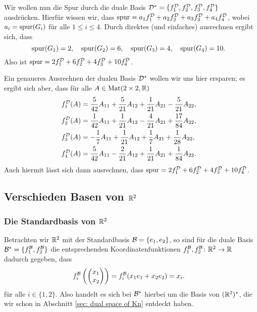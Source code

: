 \documentclass[a4paper,10pt]{article}
\begin{document}
Wir wollen nun die Spur durch die duale Basis $\mathcal{D}^* = \{f^{\mathcal{D}}_1, f^{\mathcal{D}}_2, f^{\mathcal{D}}_3, f^{\mathcal{D}}_4\}$ ausdrücken. Hierfür wissen wir, dass $\mathrm{spur} = a_1 f^{\mathcal{D}}_1 + a_2 f^{\mathcal{D}}_2 + a_3 f^{\mathcal{D}}_3 + a_4 f^{\mathcal{D}}_4$, wobei $a_i = \mathrm{spur}(G_i)$ für alle $1 \leq i \leq 4$. Durch direktes (und einfaches) ausrechnen ergibt sich, dass
\[
 \mathrm{spur}(G_1) = 2, \quad
 \mathrm{spur}(G_2) = 6, \quad
 \mathrm{spur}(G_3) = 4, \quad
 \mathrm{spur}(G_4) = 10.
\]
Also ist $\mathrm{spur} = 2 f^{\mathcal{D}}_1 + 6 f^{\mathcal{D}}_2 + 4 f^{\mathcal{D}}_3 + 10 f^{\mathcal{D}}_4$.

Ein genaueres Ausrechnen der dualen Basis $\mathcal{D}^*$ wollen wir uns hier ersparen; es ergibt sich aber, dass für alle $A \in \mathrm{Mat}(2 \times 2, \mathbb{R})$
\begin{align*}
 f^{\mathcal{D}}_1(A) &= \frac{5}{42} A_{11} + \frac{5}{21} A_{12} + \frac{1}{21} A_{21} -\frac{5}{21} A_{22}, \\
 f^{\mathcal{D}}_2(A) &= \frac{1}{42} A_{11} + \frac{1}{21} A_{12} - \frac{4}{21} A_{21} + \frac{17}{84} A_{22}, \\
 f^{\mathcal{D}}_3(A) &= -\frac{1}{7} A_{11} + \frac{1}{21} A_{12} + \frac{1}{7} A_{21} + \frac{1}{28} A_{22}, \\
 f^{\mathcal{D}}_4(A) &= \frac{5}{42} A_{11} - \frac{2}{21} A_{12} + \frac{1}{21} A_{21} + \frac{1}{84} A_{22}.
\end{align*}
Auch hiermit lässt sich dann ausrechnen, dass $\mathrm{spur} = 2 f^{\mathcal{D}}_1 + 6 f^{\mathcal{D}}_2 + 4 f^{\mathcal{D}}_3 + 10 f^{\mathcal{D}}_4$.





\subsection{Verschieden Basen von $\mathbb{R}^2$}



\subsubsection{Die Standardbasis von $\mathbb{R}^2$}
Betrachten wir $\mathbb{R}^2$ mit der Standardbasis $\mathcal{B} = \{e_1, e_2\}$, so sind für die duale Basis $\mathcal{B}^* = \{f^{\mathcal{B}}_1, f^{\mathcal{B}}_2\}$ die entsprechenden Koordinatenfunktionen $f^{\mathcal{B}}_1, f^{\mathcal{B}}_2 \colon \mathbb{R}^2 \to \mathbb{R}$ dadurch gegeben, dass
\[
 f^{\mathcal{B}}_i\left( \begin{pmatrix} x_1 \\ x_2 \end{pmatrix} \right)
 = f^{\mathcal{B}}_i(x_1 e_1 + x_2 e_2) = x_i.
\]
für alle $i \in \{1,2\}$. Also handelt es sich bei $\mathcal{B}^*$ hierbei um die Basis von $(\mathbb{R}^2)^*$, die wir schon in Abschnitt \ref{sec: dual space of Kn} entdeckt haben.
\end{document}
